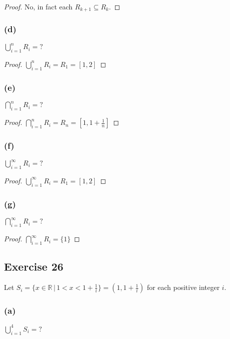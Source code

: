 \documentclass[14pt]{extarticle}
\newcommand{\dps}{\displaystyle}
\newcommand{\R}{\mathbb{R}}
\begin{document}
\begin{proof}
  No, in fact each \(R_{k+1} \subseteq R_k\).
\end{proof}

\subsubsection{(d)}
\(\dps \bigcup_{i=1}^{n}R_i = ?\)

\begin{proof}
  \(\dps \bigcup_{i=1}^{n}R_i = R_1 = [1, 2]\)
\end{proof}

\subsubsection{(e)}
\(\dps \bigcap_{i=1}^{n}R_i = ?\)

\begin{proof}
  \(\dps \bigcap_{i=1}^{n}R_i = R_n = \left[1, 1+\frac{1}{n}\right]\)
\end{proof}

\subsubsection{(f)}
\(\dps \bigcup_{i=1}^{\infty}R_i = ?\)

\begin{proof}
  \(\dps \bigcup_{i=1}^{\infty}R_i = R_1 = [1, 2]\)
\end{proof}

\subsubsection{(g)}
\(\dps \bigcap_{i=1}^{\infty}R_i = ?\)

\begin{proof}
  \(\dps \bigcap_{i=1}^{\infty}R_i = \{1\}\)
\end{proof}

\subsection{Exercise 26}
Let \(S_i = \{x \in \R \,|\, 1 < x < 1 + \frac{1}{i}\} = \left(1, 1 + \frac{1}{i}\right)\)
for each positive integer $i$.

\subsubsection{(a)}
\(\dps \bigcup_{i=1}^{4}S_i = ?\)
\end{document}

